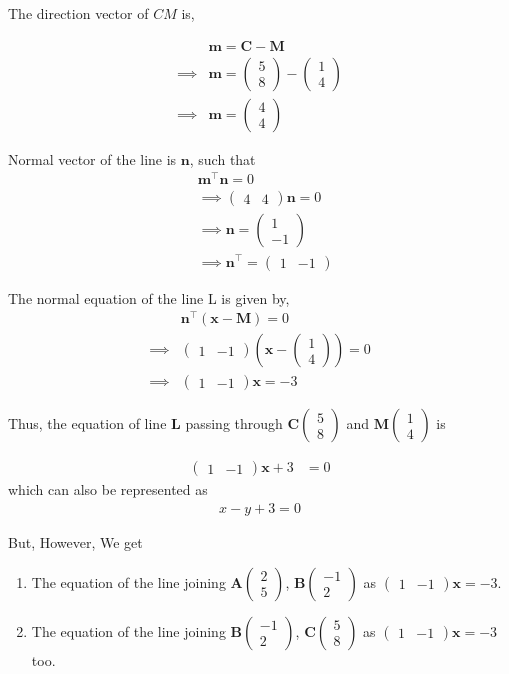 \documentclass[journal,12pt,twocolumn]{IEEEtran}
\let\vec\mathbf
\newcommand{\myvec}[1]{\ensuremath{\begin{pmatrix}#1\end{pmatrix}}}
\providecommand{\brak}[1]{\ensuremath{\left(#1\right)}}
\begin{document}
    The direction vector of $CM$ is,
    
    \begin{align}
        &\vec{m} = \vec{C} - \vec{M}\\
	    \implies &\vec{m} = \myvec{5 \\ 8} - \myvec{1 \\ 4}\\
	    \implies &\vec{m} = \myvec{4 \\ 4}
    \end{align}
    
    Normal vector of the line is $\vec{n}$, such that
    \begin{align}
	    &\vec{m}^{\top}\vec{n} = 0\\
	    &\implies \myvec{4 & 4}\vec{n} = 0\\
	    &\implies \vec{n} = \myvec{1 \\ -1}\\
	    &\implies \vec{n}^{\top} = \myvec{1 & -1}
    \end{align}
    
    The normal equation of the line L is given by, 
    \begin{align}
	    &\vec{n}^{\top}\brak{\vec{x} - \vec{M}} = 0\\
	    \implies &\myvec{1 & -1}\brak{\vec{x} - \myvec{1 \\ 4}}= 0\\
	    \implies &\myvec{1 & -1}\vec{x} = -3
    \end{align}
    
    Thus, the equation of line $\vec{L}$ passing through  $\vec{C}\myvec{5\\8}$ and $\vec{M}\myvec{1\\4}$ is 
        
    \begin{align}
          \myvec{1 & - 1}\vec{x} + 3 &= 0
    \end{align}
        which can also be represented as 
    \begin{align}
         x-y+3=0
    \end{align}
      
    {\large But, However,} We get
    \begin{enumerate}
        \item The equation of the line joining $\vec{A}\myvec{2\\5}$, $\vec{B}\myvec{-1\\2}$ as $\myvec{1 & - 1}\vec{x} = -3$.
           
        \item The equation of the line joining $\vec{B}\myvec{-1\\2}$, $\vec{C}\myvec{5\\8}$ as $\myvec{1 & - 1}\vec{x}=-3$ too.
    \end{enumerate}
   
\end{document}
